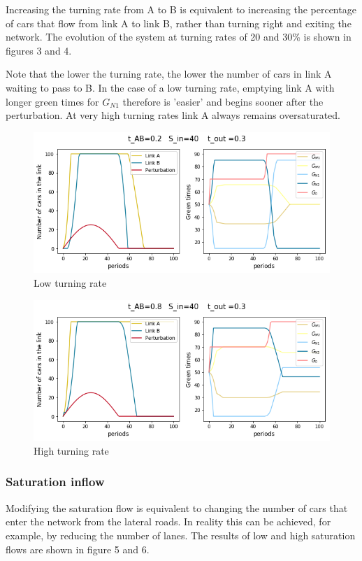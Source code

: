 \documentclass[11pt]{article}
\begin{document}
Increasing the turning rate from A to B is equivalent to increasing the percentage of cars that flow from link A to link B, rather than turning right and exiting the network. The evolution of the system at turning rates of 20 and 30\% is shown in figures 3 and 4.

Note that the lower the turning rate, the lower the number of cars in link A waiting to pass to B. In the case of a low turning rate, emptying link A with longer green times for $G_{N1}$ therefore is 'easier' and begins sooner after the perturbation. At very high turning rates link A always remains oversaturated. %

\begin{figure}[h!]
    \caption{Low turning rate}
      \centering
	\includegraphics[width=13cm]{sim1}
\end{figure}

\begin{figure}[h!]
    \caption{High turning rate}
      \centering
	\includegraphics[width=13cm]{sim8}
\end{figure}


\subsubsection{Saturation inflow}

Modifying the saturation flow is equivalent to changing the number of cars that enter the network from the lateral roads. In reality this can be achieved, for example, by reducing the number of lanes. The results of low and high saturation flows are shown in figure 5 and 6.
\end{document}
